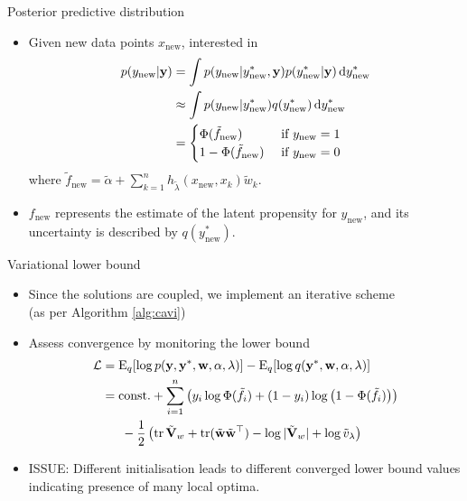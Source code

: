 \begin{frame}{Posterior predictive distribution}
  \begin{itemize}\setlength\itemsep{1em}
    \item Given new data points $x_{\text{new}}$, interested in
    \begin{align*}
      p(y_{\text{new}}|{\mathbf y}) &= \int p(y_{\text{new}} | y^*_{\text{new}}, {\mathbf y}) p (y^*_{\text{new}} | {\mathbf y}) \, \text{d} y^*_{\text{new}} \\
      &\approx \int p(y_{\text{new}} | y^*_{\text{new}}) q (y^*_{\text{new}}) \, \text{d} y^*_{\text{new}} \\
      &= \begin{cases}
        \Phi(\tilde f_{\text{new}}) & \text{ if } y_{\text{new}} = 1 \\
        1 - \Phi(\tilde f_{\text{new}}) & \text{ if } y_{\text{new}} = 0 \\
      \end{cases}
    \end{align*}
    where $\tilde f_{\text{new}} = \tilde\alpha + {\sum_{k=1}^n} h_{\tilde\lambda}(x_{\text{new}}, x_k)\tilde w_k$.
    \item $f_{\text{new}}$ represents the estimate of the latent propensity for $y_{\text{new}}$, and its uncertainty is described by $q(y_{\text{new}}^*)$.
  \end{itemize}
\end{frame}

\begin{frame}{Variational lower bound}
  \begin{itemize}\setlength\itemsep{1em}
    \item Since the solutions are coupled, we implement an iterative scheme \\ (as per Algorithm \ref{alg:cavi})
    \item Assess convergence by monitoring the lower bound
    \begin{align*}
      {\mathcal L} 
      &= \operatorname{E}_q[\log p({\mathbf y},{\mathbf y}^*,{\mathbf w},\alpha,\lambda)] - \operatorname{E}_q[\log q({\mathbf y}^*,{\mathbf w},\alpha,\lambda)] \\
      &= \text{const.} + \sum_{i=1}^n \left(y_i \log \Phi(\tilde f_i) + (1-y_i) \log \big(1 - \Phi(\tilde f_i)\big)\right) \\
      &\phantom{==}-\frac{1}{2} \left( \operatorname{tr}\tilde{{\mathbf V}}_w + \operatorname{tr} (\tilde{{\mathbf w}}\tilde{{\mathbf w}}^\top) - \log \vert \tilde{{\mathbf V}}_w \vert + \log \tilde v_\lambda \right) 
    \end{align*}
    \item ISSUE: Different initialisation leads to different converged lower bound values indicating presence of many local optima.
  \end{itemize}
\end{frame}


